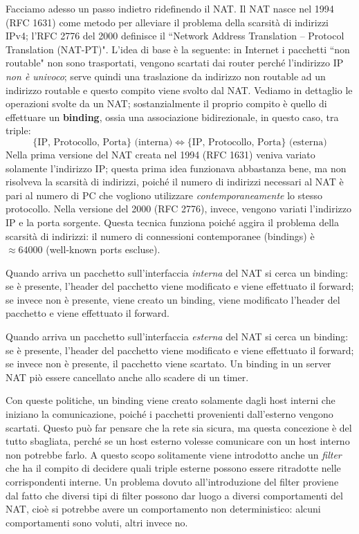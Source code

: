 Facciamo adesso un passo indietro ridefinendo il NAT. Il NAT nasce nel 1994 (RFC 1631) come metodo per alleviare il problema della scarsità di indirizzi IPv4; l'RFC 2776 del 2000 definisce il \textquotedblleft Network Address Translation -- Protocol Translation (NAT-PT)". L'idea di base è la seguente: in Internet i pacchetti \textquotedblleft non routable" non sono trasportati, vengono scartati dai router perché l'indirizzo IP \textit{non è univoco}; serve quindi una traslazione da indirizzo non routable ad un indirizzo routable e questo compito viene svolto dal NAT. Vediamo in dettaglio le operazioni svolte da un NAT; sostanzialmente il proprio compito è quello di effettuare un \textbf{binding}, ossia una associazione bidirezionale, in questo caso, tra triple:
$$\{\text{IP, Protocollo, Porta}\}\text{ (interna)} \Longleftrightarrow \{\text{IP, Protocollo, Porta}\}\text{ (esterna)}$$
Nella prima versione del NAT creata nel 1994 (RFC 1631) veniva variato solamente l'indirizzo IP; questa prima idea funzionava abbastanza bene, ma non risolveva la scarsità di indirizzi, poiché il numero di indirizzi necessari al NAT è pari al numero di PC che vogliono utilizzare \textit{contemporaneamente} lo stesso protocollo. Nella versione del 2000 (RFC 2776), invece, vengono variati l'indirizzo IP e la porta sorgente. Questa tecnica funziona poiché aggira il problema della scarsità di indirizzi: il numero di connessioni contemporanee (bindings) è $\approx 64000$ (well-known ports escluse).

Quando arriva un pacchetto sull'interfaccia \textit{interna} del NAT si cerca un binding: se è presente, l'header del pacchetto viene modificato e viene effettuato il forward; se invece non è presente, viene creato un binding, viene modificato l'header del pacchetto e viene effettuato il forward.

Quando arriva un pacchetto sull'interfaccia \textit{esterna} del NAT si cerca un binding: se è presente, l'header del pacchetto viene modificato e viene effettuato il forward; se invece non è presente, il pacchetto viene scartato. Un binding in un server NAT piò essere cancellato anche allo scadere di un timer.

Con queste politiche, un binding viene creato solamente dagli host interni che iniziano la comunicazione, poiché i pacchetti provenienti dall'esterno vengono scartati. Questo può far pensare che la rete sia sicura, ma questa concezione è del tutto sbagliata, perché se un host esterno volesse comunicare con un host interno non potrebbe farlo. A questo scopo solitamente viene introdotto anche un \textit{filter} che ha il compito di decidere quali triple esterne possono essere ritradotte nelle corrispondenti interne. Un problema dovuto all'introduzione del filter proviene dal fatto che diversi tipi di filter possono dar luogo a diversi comportamenti del NAT, cioè si potrebbe avere un comportamento non deterministico: alcuni comportamenti sono voluti, altri invece no.\\

